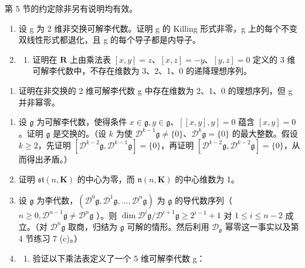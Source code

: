 
第 5 节的约定除非另有说明均有效。

\begin{enumerate}
\def\labelenumi{\arabic{enumi}.}
\item
  设 g 为 2 维非交换可解李代数。证明 g 的 Killing 形式非零，g 上的每个不变双线性形式都退化，且 g 的每个导子都是内导子。
\item
  \begin{enumerate}
  \def\labelenumii{(\alph{enumii})}
  \tightlist
  \item
    证明在 \(\mathbf{R}\) 上由乘法表 \([x, y] = z\)、\([x, z] = -y\)、\([y, z] = 0\) 定义的 3 维可解李代数中，不存在维数为 3、2、1、0 的递降理想序列。
  \end{enumerate}
\end{enumerate}

\begin{enumerate}
\def\labelenumi{(\alph{enumi})}
\setcounter{enumi}{1}
\tightlist
\item
  证明在非交换的 2 维可解李代数 g 中存在维数为 2、1、0 的理想序列，但 g 并非幂零。
\end{enumerate}

\begin{enumerate}
\def\labelenumi{\arabic{enumi}.}
\setcounter{enumi}{2}
\item
  设 \(\mathfrak{g}\) 为可解李代数，使得条件 \(x\in \mathfrak{g},y\in \mathfrak{g}\)、\([[x,y],y] = 0\) 蕴含 \([x,y] = 0\)。证明 \(\mathfrak{g}\) 是交换的。（设 \(k\) 为使 \(\mathcal{D}^{k - 1}\mathfrak{g}\neq \{0\}\)、\(\mathcal{D}^k\mathfrak{g} = \{0\}\) 的最大整数。假设 \(k\geqslant 2\)，先证明 \([\mathcal{D}^{k - 2}\mathfrak{g},\mathcal{D}^{k - 1}\mathfrak{g}] = \{0\}\)，再证明 \([\mathcal{D}^{k - 2}\mathfrak{g},\mathcal{D}^{k - 2}\mathfrak{g}] = \{0\}\)，从而得出矛盾。）
\item
  证明 \(\mathfrak{st}(n,\mathbf{K})\) 的中心为零，而 \(\mathfrak{n}(n,\mathbf{K})\) 的中心维数为 1。
\item
  设 \(\mathfrak{g}\) 为李代数，\((\mathcal{D}^0\mathfrak{g},\mathcal{D}^1\mathfrak{g},\ldots ,\mathcal{D}^n\mathfrak{g})\) 为 \(\mathfrak{g}\) 的导代数序列（ \(n\geqslant 0,\mathcal{D}^{n - 1}\mathfrak{g}\neq \mathcal{D}^n\mathfrak{g}\) ）。则 \(\dim \mathcal{D}^i\mathfrak{g} / \mathcal{D}^{i + 1}\mathfrak{g}\geqslant 2^{i - 1} + 1\) 对 \(1\leqslant i\leqslant n - 2\) 成立。（对 \(\mathcal{D}^n\mathfrak{g}\) 取商，归结为 \(\mathfrak{g}\) 可解的情形。然后利用 \(\mathcal{D}_{\mathfrak{g}}\) 幂零这一事实以及第 4 节练习 7 (c)。）
\item
  \begin{enumerate}
  \def\labelenumii{(\alph{enumii})}
  \tightlist
  \item
    验证以下乘法表定义了一个 5 维可解李代数 g：
  \end{enumerate}
\end{enumerate}

